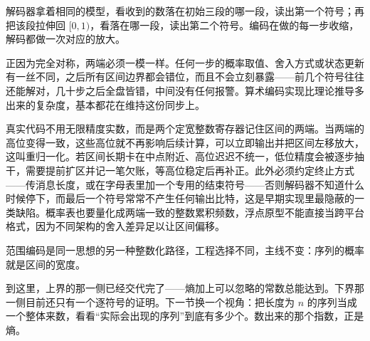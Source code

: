 解码器拿着相同的模型，看收到的数落在初始三段的哪一段，读出第一个符号；再把该段拉伸回 \([0,1)\)，看落在哪一段，读出第二个符号。编码在做的每一步收缩，解码都做一次对应的放大。

正因为完全对称，两端必须一模一样。任何一步的概率取值、舍入方式或状态更新有一丝不同，之后所有区间边界都会错位，而且不会立刻暴露——前几个符号往往还能解对，几十步之后全盘皆错，中间没有任何报警。算术编码实现比理论推导多出来的复杂度，基本都花在维持这份同步上。

真实代码不用无限精度实数，而是两个定宽整数寄存器记住区间的两端。当两端的高位变得一致，这些高位就不再影响后续计算，可以立即输出并把区间左移放大，这叫重归一化。若区间长期卡在中点附近、高位迟迟不统一，低位精度会被逐步抽干，需要提前扩区并记一笔欠账，等高位稳定后再补正。此外必须约定终止方式——传消息长度，或在字母表里加一个专用的结束符号——否则解码器不知道什么时候停下，而最后一个符号常常不产生任何输出比特，这是早期实现里最隐蔽的一类缺陷。概率表也要量化成两端一致的整数累积频数，浮点原型不能直接当跨平台格式，因为不同架构的舍入差异足以让区间偏移。

范围编码是同一思想的另一种整数化路径，工程选择不同，主线不变：序列的概率就是区间的宽度。

到这里，上界的那一侧已经交代完了——熵加上可以忽略的常数总能达到。下界那一侧目前还只有一个逐符号的证明。下一节换一个视角：把长度为 \(n\) 的序列当成一个整体来数，看看``实际会出现的序列''到底有多少个。数出来的那个指数，正是熵。
